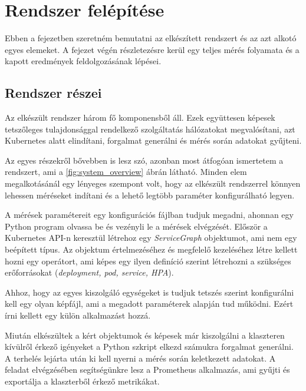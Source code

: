 \chapter{Rendszer felépítése}
\label{sec:system}
Ebben a fejezetben szeretném bemutatni az elkészített rendszert és az azt alkotó egyes elemeket.
A fejezet végén részletezésre kerül egy teljes mérés folyamata és a kapott eredmények feldolgozásának lépései.

\section{Rendszer részei}
Az elkészült rendszer három fő komponensből áll. Ezek együttesen képesek tetszőleges tulajdonsággal rendelkező szolgáltatás hálózatokat megvalósítani, azt Kubernetes alatt elindítani, forgalmat generálni és mérés során adatokat gyűjteni. 

Az egyes részekről bővebben is lesz szó, azonban most átfogóan ismertetem a rendszert, ami a \ref{fig:system_overview} ábrán látható. Minden elem megalkotásánál egy lényeges szempont volt, hogy az elkészült rendszerrel könnyen lehessen méréseket indítani és a lehető legtöbb paraméter konfigurálható legyen.

A mérések paramétereit egy konfigurációs fájlban tudjuk megadni, ahonnan egy Python program olvassa be és vezényli le a mérések elvégzését.
Először a Kubernetes API-n keresztül létrehoz egy \textit{ServiceGraph} objektumot, ami nem egy beépített típus.
Az objektum értelmezéséhez és megfelelő kezeléséhez létre kellett hozni egy operátort, ami képes egy ilyen definíció szerint létrehozni a szükséges erőforrásokat (\textit{deployment, pod, service, HPA}).

Ahhoz, hogy az egyes kiszolgáló egységeket is tudjuk tetszés szerint konfigurálni kell egy olyan képfájl, ami a megadott paraméterek alapján tud működni.
Ezért írni kellett egy külön alkalmazást hozzá.

Miután elkészültek a kért objektumok és képesek már kiszolgálni a klaszteren kívülről érkező igényeket a Python szkript elkezd számukra forgalmat generálni.
A terhelés lejárta után ki kell nyerni a mérés során keletkezett adatokat.
A feladat elvégzésében segítségünkre lesz a Prometheus\citep{Prometheus} alkalmazás, ami gyűjti és exportálja a klaszterből érkező metrikákat. 

